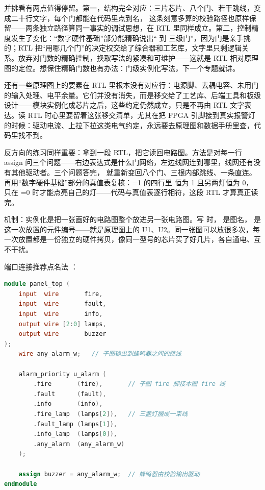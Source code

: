 并排看有两点值得停留。第一，结构完全对应：三片芯片、八个门、若干跳线，变成二十行文字，每个门都能在代码里点到名， 这条刻意多算的校验路径也原样保留——两条独立路径算同一事实的调试思想，在 RTL 里同样成立。第二，控制精度发生了变化：“数字硬件基础”部分能精确说出“ 到  三级门”，因为门是亲手挑的；RTL 把“用哪几个门”的决定权交给了综合器和工艺库，文字里只剩逻辑关系。放弃对门数的精确控制，换取写法的紧凑和可维护——这就是 RTL 相对原理图的定位。想保住精确门数也有办法：门级实例化写法，下一个专题就讲。

还有一些原理图上的要素在 RTL 里根本没有对应行：电源脚、去耦电容、未用门的输入处理、电平余量。它们并没有消失，而是移交给了工艺库、后端工具和板级设计——模块实例化成芯片之后，这些约定仍然成立，只是不再由 RTL 文字表达。读 RTL 时心里要留着这张移交清单，尤其在把 FPGA 引脚接到真实报警灯的时候：驱动电流、上拉下拉这类电气约定，永远要去原理图和数据手册里查，代码里找不到。

反方向的练习同样重要：拿到一段 RTL，把它读回电路图。方法是对每一行 assign 问三个问题——右边表达式是什么门网络，左边线网连到哪里，线网还有没有其他驱动者。三个问题答完， 就重新变回八个门、三根内部跳线、一条直连。再用“数字硬件基础”部分的真值表复核：=1 的四行里  恒为 1 且另两灯恒为 0， 只在 =0 时才能点亮自己的灯——代码与真值表逐行相符，这段 RTL 才算真正读完。

机制：实例化是把一张画好的电路图整个放进另一张电路图。写  时， 是图名， 是这一次放置的元件编号——就是原理图上的 U1、U2。同一张图可以放很多次，每一次放置都是一份独立的硬件拷贝，像同一型号的芯片买了好几片，各自通电、互不干扰。

端口连接推荐点名法 ：

\begin{lstlisting}[language=Verilog]
module panel_top (
    input  wire       fire,
    input  wire       fault,
    input  wire       info,
    output wire [2:0] lamps,
    output wire       buzzer
);
    wire any_alarm_w;   // 子图输出到蜂鸣器之间的跳线

    alarm_priority u_alarm (
        .fire       (fire),       // 子图 fire 脚接本图 fire 线
        .fault      (fault),
        .info       (info),
        .fire_lamp  (lamps[2]),   // 三盏灯捆成一束线
        .fault_lamp (lamps[1]),
        .info_lamp  (lamps[0]),
        .any_alarm  (any_alarm_w)
    );

    assign buzzer = any_alarm_w;  // 蜂鸣器由校验输出驱动
endmodule
\end{lstlisting}

